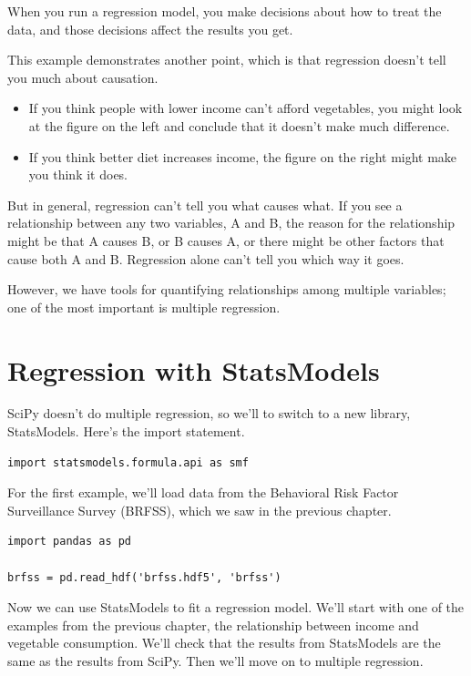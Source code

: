 When you run a regression model, you make decisions about how to treat
the data, and those decisions affect the results you get.

This example demonstrates another point, which is that regression
doesn't tell you much about causation.

\begin{itemize}
\item
  If you think people with lower income can't afford vegetables, you
  might look at the figure on the left and conclude that it doesn't make
  much difference.
\item
  If you think better diet increases income, the figure on the right
  might make you think it does.
\end{itemize}

But in general, regression can't tell you what causes what. If you see a
relationship between any two variables, A and B, the reason for the
relationship might be that A causes B, or B causes A, or there might be
other factors that cause both A and B. Regression alone can't tell you
which way it goes.

However, we have tools for quantifying relationships among multiple
variables; one of the most important is multiple regression.

\hypertarget{regression-with-statsmodels}{%
\section{Regression with
StatsModels}\label{regression-with-statsmodels}}

SciPy doesn't do multiple regression, so we'll to switch to a new
library, StatsModels. Here's the import statement.

\begin{lstlisting}[]
import statsmodels.formula.api as smf
\end{lstlisting}

For the first example, we'll load data from the Behavioral Risk Factor
Surveillance Survey (BRFSS), which we saw in the previous chapter.

\begin{lstlisting}[]
import pandas as pd

brfss = pd.read_hdf('brfss.hdf5', 'brfss')
\end{lstlisting}

Now we can use StatsModels to fit a regression model. We'll start with
one of the examples from the previous chapter, the relationship between
income and vegetable consumption. We'll check that the results from
StatsModels are the same as the results from SciPy. Then we'll move on
to multiple regression.

